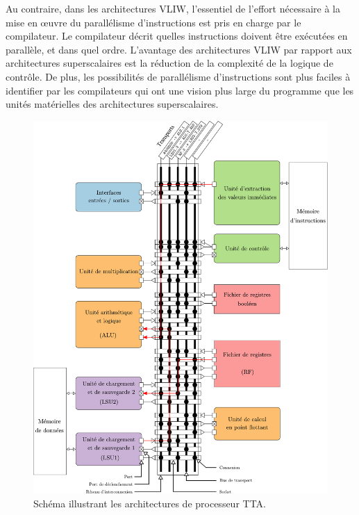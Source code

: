 Au contraire, dans les architectures VLIW, l'essentiel de l'effort nécessaire à la mise en œuvre du parallélisme d'instructions est pris en charge par le compilateur. Le compilateur décrit quelles instructions doivent être exécutées en parallèle, et dans quel ordre. L'avantage des architectures VLIW par rapport aux architectures superscalaires est la réduction de la complexité de la logique de contrôle. De plus, les possibilités de parallélisme d'instructions sont plus faciles à identifier par les compilateurs qui ont une vision plus large du programme que les unités matérielles des architectures superscalaires.


\begin{figure}[htp]
\centering
\includegraphics[width=\textwidth]{main/ch4_fig/archi_tta}
\caption{Schéma illustrant les architectures de processeur TTA.}
\label{fig:tta_example}
\end{figure}



